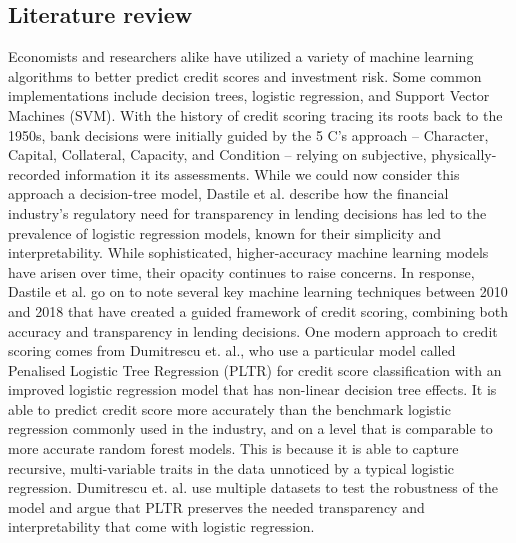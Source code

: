 \documentclass[11pt]{article}
\begin{document}
\begin{multicols}{2}
\section*{Literature review}
Economists and researchers alike have utilized a variety of machine learning algorithms to better predict credit scores and investment risk.
Some common implementations include decision trees, logistic regression, and Support Vector Machines (SVM).
\vspace{5mm}\newline
With the history of credit scoring tracing its roots back to the 1950s, bank decisions were initially guided by the
5 C's approach -- Character, Capital, Collateral, Capacity, and Condition -- relying on subjective, physically-recorded information it its
assessments.
While we could now consider this approach a decision-tree model, Dastile et al. describe how the financial industry's regulatory need for
transparency in lending decisions has led to the prevalence of logistic regression models, known for their simplicity and interpretability.
While sophisticated, higher-accuracy machine learning models have arisen over time, their opacity continues to raise concerns.
In response, Dastile et al. go on to note several key machine learning techniques between 2010 and 2018 that have created a guided
framework of credit scoring, combining both accuracy and transparency in lending decisions.
\vspace{5mm}\newline
One modern approach to credit scoring comes from Dumitrescu et. al., who use a particular model called Penalised Logistic Tree Regression
(PLTR) for credit score classification with an improved logistic regression model that has non-linear decision tree effects.
It is able to predict credit score more accurately than the benchmark logistic regression commonly used in the industry, and on a level
that is comparable to more accurate random forest models.
This is because it is able to capture recursive, multi-variable traits in the data unnoticed by a typical logistic regression.
Dumitrescu et. al. use multiple datasets to test the robustness of the model and argue that PLTR preserves the needed transparency and
interpretability that come with logistic regression.


\end{multicols}
\end{document}
